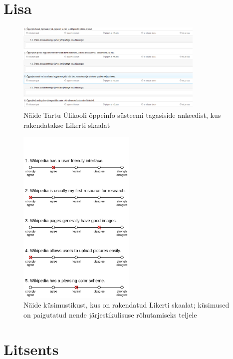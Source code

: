 \documentclass[a4paper,12pt,oneside]{article}
\numberwithin{equation}{section}
\theoremstyle{definition}
\begin{document}
\pagebreak
{}



\section*{Lisa}


\begin{figure}[H]
\centering
\includegraphics[width=0.8\textwidth]{ois_tagasiside_toodeldud.png}
\caption{Näide Tartu \"Ulikooli õppeinfo s\"usteemi tagasiside ankeedist, kus rakendatakse Likerti skaalat \cite{UT}}
\label{likert1}
\end{figure}

\begin{figure}[H]
\centering
\includegraphics[width=0.5\textwidth, height = 0.7\textwidth]{Example_Likert_Scale.png}
\caption{Näide k\"usimustikust, kus on rakendatud Likerti skaalat; k\"usimused on paigutatud nende järjestikulisuse rõhutamiseks teljele\cite{Smith}}
\label{likert2}
\end{figure}


\makeatletter
\newpage
\pagestyle{empty}
\section*{Litsents}
\end{document}
